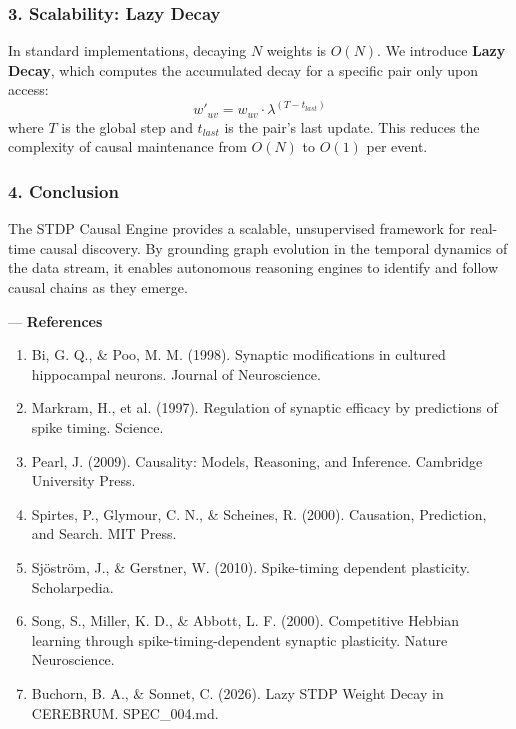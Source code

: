 \documentclass[10pt,journal,compsoc]{IEEEtran}
\begin{document}
\subsubsection{3. Scalability: Lazy Decay}
In standard imple\-mentations, decaying $N$ weights is $O(N)$. We introduce \textbf{Lazy Decay}, which computes the accumulated decay for a specific pair only upon access:
\begin{equation}
w'_{uv} = w_{uv} \cdot \lambda^{(T - t_{last})}
\end{equation}
where $T$ is the global step and $t_{last}$ is the pair's last update. This reduces the complexity of causal maintenance from $O(N)$ to $O(1)$ per event.

\subsubsection{4. Conclusion}
The STDP Causal Engine provides a scalable, unsup\-ervised framework for real-time causal discovery. By grounding graph evolution in the temporal dynamics of the data stream, it enables autonomous reasoning engines to identify and follow causal chains as they emerge.

---
\textbf{References}
\begin{enumerate}
\item Bi, G. Q., \& Poo, M. M. (1998). Synaptic modif\-ications in cultured hippocampal neurons. Journal of Neuros\-cience.
\item Markram, H., et al. (1997). Regulation of synaptic efficacy by predictions of spike timing. Science.
\item Pearl, J. (2009). Causality: Models, Reasoning, and Inference. Cambridge University Press.
\item Spirtes, P., Glymour, C. N., \& Scheines, R. (2000). Causation, Prediction, and Search. MIT Press.
\item Sjöström, J., \& Gerstner, W. (2010). Spike-timing dependent plasticity. Schola\-rpedia.
\item Song, S., Miller, K. D., \& Abbott, L. F. (2000). Competitive Hebbian learning through spike-timing-dependent synaptic plasticity. Nature Neuros\-cience.
\item Buchorn, B. A., \& Sonnet, C. (2026). Lazy STDP Weight Decay in CEREBRUM. SPEC\_004.md.

\end{enumerate}



\end{document}
